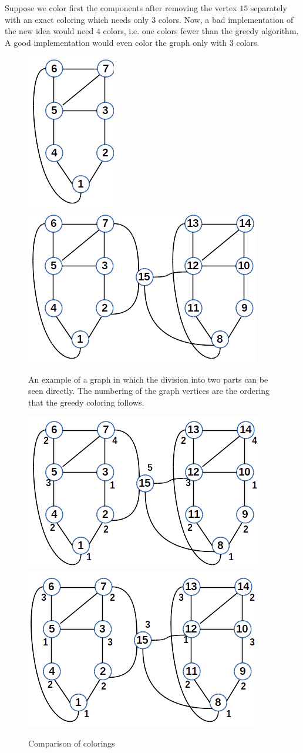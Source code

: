 \documentclass[11pt, twoside,a4paper]{book}
\begin{document}
Suppose we color first the components after removing the vertex $15$ separately with
an exact coloring which needs only $3$ colors. Now, a bad implementation of the 
new idea would need $4$ colors, i.e. one colors fewer than the greedy algorithm.
A good implementation would even color the graph only with $3$ colors.
\begin{figure}
\centering
\includegraphics[width=0.18\linewidth]{coloring0}
\hfill
\includegraphics[width=0.48\linewidth]{coloring1}
\caption{
An example of a graph in which the division into two parts can be seen directly.
The numbering of the graph vertices are the ordering that the greedy coloring 
follows.
}
\label{f.coloring.graph}
\end{figure}

\begin{figure}
\centering
\includegraphics[width=0.48\linewidth]{coloring2}
\hfill
\includegraphics[width=0.48\linewidth]{coloring3}
\caption{Comparison of colorings}
\label{f.coloring.compared}
\end{figure}
\end{document}
